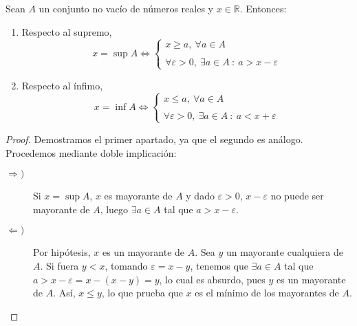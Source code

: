\begin{prop}
    Sean $A$ un conjunto no vacío de números reales y $x \in \mathbb{R}$. Entonces:
    \begin{enumerate}
        \item Respecto al supremo,
        \begin{equation*}
            x = \sup A \Longleftrightarrow
            \left\{ \begin{array}{lcc}
                x \geq a, ~\forall a \in A \\ \\
                \forall \varepsilon > 0, ~\exists a \in A ~:~ a > x-\varepsilon
                \end{array}
            \right.
        \end{equation*}

        \item Respecto al ínfimo,
        \begin{equation*}
            x = \inf A \Longleftrightarrow
            \left\{ \begin{array}{lcc}
                x \leq a, ~\forall a \in A \\ \\
                \forall \varepsilon > 0, ~\exists a \in A ~:~ a < x+\varepsilon
                \end{array}
            \right.
        \end{equation*}
    \end{enumerate}
\end{prop}
\begin{proof} Demostramos el primer apartado, ya que el segundo es análogo. Procedemos mediante doble implicación:
\begin{description}
    \item [$\Longrightarrow)$] Si $x = \sup A$, $x$ es mayorante de $A$ y dado $\varepsilon > 0$, $x - \varepsilon$ no puede ser mayorante de $A$, luego $\exists a \in A$ tal que $a > x-\varepsilon$.
    
    \item [$\Longleftarrow)$] Por hipótesis, $x$ es un mayorante de $A$. Sea $y$ un mayorante cualquiera de $A$. Si fuera $y < x$, tomando $\varepsilon = x-y$, tenemos que $\exists a \in A$ tal que $a > x-\varepsilon = x - (x-y) = y$, lo cual es absurdo, pues $y$ es un mayorante de $A$. Así, $x \leq y$, lo que prueba que $x$ es el mínimo de los mayorantes de $A$.
\end{description}
\end{proof}

